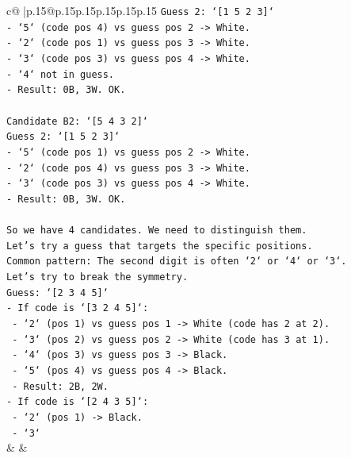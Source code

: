 \documentclass{article}
\begin{document}
{\begin{supertabular}{c@{$\;$}|p{.15\linewidth}@{}p{.15\linewidth}p{.15\linewidth}p{.15\linewidth}p{.15\linewidth}p{.15\linewidth}}
{{{\texttt{Guess 2: `{[}1 5 2 3{]}`} \\
\texttt{{-} `5` (code pos 4) vs guess pos 2 {-}> White.} \\
\texttt{{-} `2` (code pos 1) vs guess pos 3 {-}> White.} \\
\texttt{{-} `3` (code pos 3) vs guess pos 4 {-}> White.} \\
\texttt{{-} `4` not in guess.} \\
\texttt{{-} Result: 0B, 3W. OK.} \\
\\ 
\texttt{Candidate B2: `{[}5 4 3 2{]}`} \\
\texttt{Guess 2: `{[}1 5 2 3{]}`} \\
\texttt{{-} `5` (code pos 1) vs guess pos 2 {-}> White.} \\
\texttt{{-} `2` (code pos 4) vs guess pos 3 {-}> White.} \\
\texttt{{-} `3` (code pos 3) vs guess pos 4 {-}> White.} \\
\texttt{{-} Result: 0B, 3W. OK.} \\
\\ 
\texttt{So we have 4 candidates. We need to distinguish them.} \\
\texttt{Let's try a guess that targets the specific positions.} \\
\texttt{Common pattern: The second digit is often `2` or `4` or `3`.} \\
\texttt{Let's try to break the symmetry.} \\
\texttt{Guess: `{[}2 3 4 5{]}`} \\
\texttt{{-} If code is `{[}3 2 4 5{]}`:} \\
\texttt{  {-} `2` (pos 1) vs guess pos 1 {-}> White (code has 2 at 2).} \\
\texttt{  {-} `3` (pos 2) vs guess pos 2 {-}> White (code has 3 at 1).} \\
\texttt{  {-} `4` (pos 3) vs guess pos 3 {-}> Black.} \\
\texttt{  {-} `5` (pos 4) vs guess pos 4 {-}> Black.} \\
\texttt{  {-} Result: 2B, 2W.} \\
\texttt{{-} If code is `{[}2 4 3 5{]}`:} \\
\texttt{  {-} `2` (pos 1) {-}> Black.} \\
\texttt{  {-} `3`} \\
            }
        }
    }
    & & \\ \\


\end{supertabular}}
\end{document}
